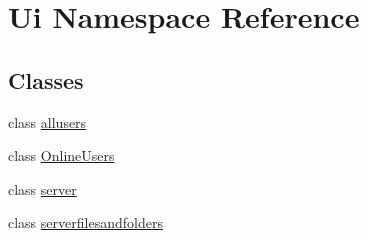 \hypertarget{namespaceUi}{\section{Ui Namespace Reference}
\label{namespaceUi}
}
\subsection*{Classes}
\begin{DoxyCompactItemize}
\item 
class \hyperlink{classUi_1_1allusers}{allusers}
\item 
class \hyperlink{classUi_1_1OnlineUsers}{Online\-Users}
\item 
class \hyperlink{classUi_1_1server}{server}
\item 
class \hyperlink{classUi_1_1serverfilesandfolders}{serverfilesandfolders}
\end{DoxyCompactItemize}
